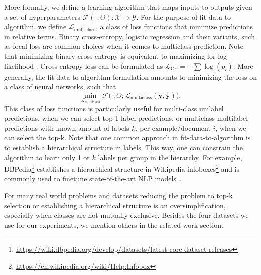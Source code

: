 More formally, we define a learning algorithm that maps inputs to outputs given a set of hyperparameters \(\mathcal{F}(\cdot ; \Theta): \mathcal{X} \rightarrow \mathcal{Y}\). For the purpose of fit-data-to-algorithm,
we define \(\mathcal{L}_{\text {multiclass}}\), a class of loss functions that
minimize predictions in relative terms. Binary cross-entropy, logistic regression and their
variants, such as focal loss are common choices when it comes to
multiclass prediction. Note that minimizing binary cross-entropy is equivalent to maximizing for log-likelihood
\cite[Section 4.3.4]{Bishop}. 
Cross-entropy loss can be formulated as
\(\mathcal{L}_{\text {CE}}=-\sum \log \left(p_{i}\right)\). 
More generally, the fit-data-to-algorithm formulation amounts to minimizing the loss on a class of neural networks, such that
% 
\begin{equation}
\underset{\mathcal{L}_{\text {multiclass}}} {\min} \mathcal{F}\big(\cdot ;
\Theta; \mathcal{L}_{\text {multiclass}} (\mathbf{y}, \hat{\mathbf{y}})\big),
\end{equation}
%
This class of loss functions is particularly useful for multi-class unilabel predictions, when we can select top-1 label predictions, or multiclass multilabel predictions with known amount of labels $k_i$ per example/document $i$, when we can select the top-k. Note that one common approach in fit-data-to-algorithm is to establish a hierarchical structure in labels. This way, one can constrain the algorithm to learn only 1 or $k$ labels per group in the hierarchy. For example, DBPedia\footnote{\url{https://wiki.dbpedia.org/develop/datasets/latest-core-dataset-releases} } establishes a hierarchical structure in Wikipedia infoboxes\footnote{\url{https://en.wikipedia.org/wiki/Help:Infobox} } and is commonly used to finetune state-of-the-art NLP models~\citep[see, e.g.,][]{XLNet, ULMFit}.

For many real world problems and datasets reducing the problem to top-k selection or establishing a hierarchical structure is an oversimplification, especially when classes are not mutually exclusive. Besides the four datasets we use for our experiments, we mention others in the related work section.

